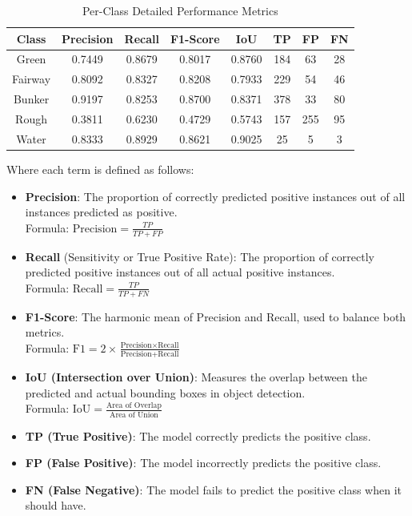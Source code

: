 \documentclass[final]{cmpreport_02}
\begin{document}
\begin{table}[H]
\centering
\begin{tabular}{c|c|c|c|c|c|c|c}
\hline
\textbf{Class} & \textbf{Precision} & \textbf{Recall} & \textbf{F1-Score} & \textbf{IoU} & \textbf{TP} & \textbf{FP} & \textbf{FN} \\
\hline
\hline
Green & 0.7449 & 0.8679 & 0.8017 & 0.8760 & 184 & 63 & 28 \\
Fairway & 0.8092 & 0.8327 & 0.8208 & 0.7933 & 229 & 54 & 46 \\
Bunker & 0.9197 & 0.8253 & 0.8700 & 0.8371 & 378 & 33 & 80 \\
Rough & 0.3811 & 0.6230 & 0.4729 & 0.5743 & 157 & 255 & 95 \\
Water & 0.8333 & 0.8929 & 0.8621 & 0.9025 & 25 & 5 & 3 \\
\hline
\end{tabular}
\caption{Per-Class Detailed Performance Metrics}
\label{tab:class_metrics}
\end{table}


Where each term is defined as follows:
\begin{itemize}
    \item \textbf{Precision}: The proportion of correctly predicted positive instances out of all instances predicted as positive.\\
    Formula: $\displaystyle \text{Precision} = \frac{TP}{TP + FP}$

    \item \textbf{Recall} (Sensitivity or True Positive Rate): The proportion of correctly predicted positive instances out of all actual positive instances.\\
    Formula: $\displaystyle \text{Recall} = \frac{TP}{TP + FN}$

    \item \textbf{F1-Score}: The harmonic mean of Precision and Recall, used to balance both metrics.\\
    Formula: $\displaystyle \text{F1} = 2 \times \frac{\text{Precision} \times \text{Recall}}{\text{Precision} + \text{Recall}}$

    \item \textbf{IoU (Intersection over Union)}: Measures the overlap between the predicted and actual bounding boxes in object detection.\\
    Formula: $\displaystyle \text{IoU} = \frac{\text{Area of Overlap}}{\text{Area of Union}}$

    \item \textbf{TP (True Positive)}: The model correctly predicts the positive class.

    \item \textbf{FP (False Positive)}: The model incorrectly predicts the positive class.

    \item \textbf{FN (False Negative)}: The model fails to predict the positive class when it should have.
\end{itemize}
\end{document}
